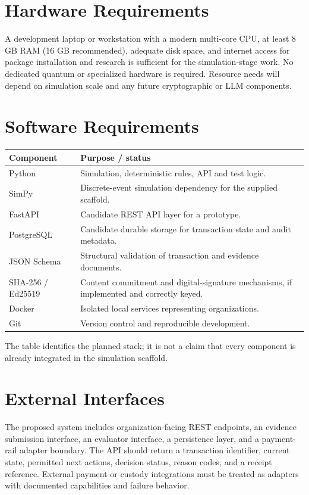 \documentclass[12pt,a4paper,oneside]{report}
\begin{document}
\section{Hardware Requirements}
A development laptop or workstation with a modern multi-core CPU, at least 8 GB RAM (16 GB recommended), adequate disk space, and internet access for package installation and research is sufficient for the simulation-stage work. No dedicated quantum or specialized hardware is required. Resource needs will depend on simulation scale and any future cryptographic or LLM components.

\section{Software Requirements}
\begin{longtable}{>{\raggedright\arraybackslash}p{}>{\raggedright\arraybackslash}p{}}
\toprule Component & Purpose / status\\
\midrule
Python & Simulation, deterministic rules, API and test logic.\\
SimPy & Discrete-event simulation dependency for the supplied scaffold.\\
FastAPI & Candidate REST API layer for a prototype.\\
PostgreSQL & Candidate durable storage for transaction state and audit metadata.\\
JSON Schema & Structural validation of transaction and evidence documents.\\
SHA-256 / Ed25519 & Content commitment and digital-signature mechanisms, if implemented and correctly keyed.\\
Docker & Isolated local services representing organizations.\\
Git & Version control and reproducible development.\\
\bottomrule
\end{longtable}
The table identifies the planned stack; it is not a claim that every component is already integrated in the simulation scaffold.

\section{External Interfaces}
The proposed system includes organization-facing REST endpoints, an evidence submission interface, an evaluator interface, a persistence layer, and a payment-rail adapter boundary. The API should return a transaction identifier, current state, permitted next actions, decision status, reason codes, and a receipt reference. External payment or custody integrations must be treated as adapters with documented capabilities and failure behavior.
\end{document}
